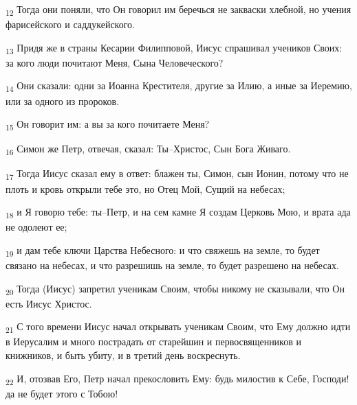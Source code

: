 \begin{tcolorbox}
\textsubscript{12} Тогда они поняли, что Он говорил им беречься не закваски хлебной, но учения фарисейского и саддукейского.
\end{tcolorbox}
\begin{tcolorbox}
\textsubscript{13} Придя же в страны Кесарии Филипповой, Иисус спрашивал учеников Своих: за кого люди почитают Меня, Сына Человеческого?
\end{tcolorbox}
\begin{tcolorbox}
\textsubscript{14} Они сказали: одни за Иоанна Крестителя, другие за Илию, а иные за Иеремию, или за одного из пророков.
\end{tcolorbox}
\begin{tcolorbox}
\textsubscript{15} Он говорит им: а вы за кого почитаете Меня?
\end{tcolorbox}
\begin{tcolorbox}
\textsubscript{16} Симон же Петр, отвечая, сказал: Ты--Христос, Сын Бога Живаго.
\end{tcolorbox}
\begin{tcolorbox}
\textsubscript{17} Тогда Иисус сказал ему в ответ: блажен ты, Симон, сын Ионин, потому что не плоть и кровь открыли тебе это, но Отец Мой, Сущий на небесах;
\end{tcolorbox}
\begin{tcolorbox}
\textsubscript{18} и Я говорю тебе: ты--Петр, и на сем камне Я создам Церковь Мою, и врата ада не одолеют ее;
\end{tcolorbox}
\begin{tcolorbox}
\textsubscript{19} и дам тебе ключи Царства Небесного: и что свяжешь на земле, то будет связано на небесах, и что разрешишь на земле, то будет разрешено на небесах.
\end{tcolorbox}
\begin{tcolorbox}
\textsubscript{20} Тогда (Иисус) запретил ученикам Своим, чтобы никому не сказывали, что Он есть Иисус Христос.
\end{tcolorbox}
\begin{tcolorbox}
\textsubscript{21} С того времени Иисус начал открывать ученикам Своим, что Ему должно идти в Иерусалим и много пострадать от старейшин и первосвященников и книжников, и быть убиту, и в третий день воскреснуть.
\end{tcolorbox}
\begin{tcolorbox}
\textsubscript{22} И, отозвав Его, Петр начал прекословить Ему: будь милостив к Себе, Господи! да не будет этого с Тобою!
\end{tcolorbox}
